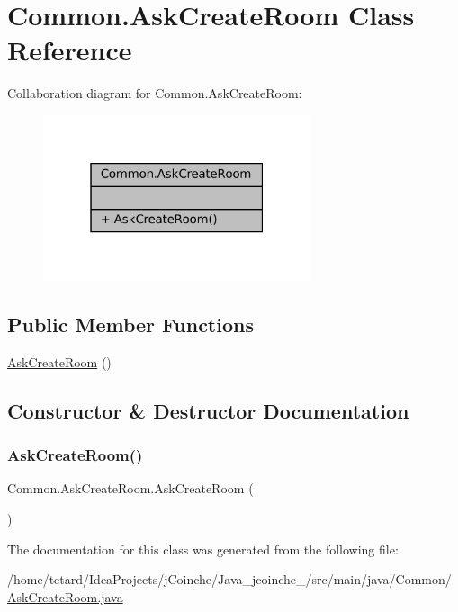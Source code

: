 \hypertarget{classCommon_1_1AskCreateRoom}{}\section{Common.\+Ask\+Create\+Room Class Reference}
\label{classCommon_1_1AskCreateRoom}


Collaboration diagram for Common.\+Ask\+Create\+Room\+:
\nopagebreak
\begin{figure}[H]
\begin{center}
\leavevmode
\includegraphics[width=223pt]{classCommon_1_1AskCreateRoom__coll__graph}
\end{center}
\end{figure}
\subsection*{Public Member Functions}
\begin{DoxyCompactItemize}
\item 
\mbox{\hyperlink{classCommon_1_1AskCreateRoom_ad7300cacf0663fd4f4a618219ae41ab3}{Ask\+Create\+Room}} ()
\end{DoxyCompactItemize}


\subsection{Constructor \& Destructor Documentation}
\mbox{\label{classCommon_1_1AskCreateRoom_ad7300cacf0663fd4f4a618219ae41ab3}} 
\subsubsection{\texorpdfstring{Ask\+Create\+Room()}{AskCreateRoom()}}
{\footnotesize\ttfamily Common.\+Ask\+Create\+Room.\+Ask\+Create\+Room (\begin{DoxyParamCaption}{ }\end{DoxyParamCaption})\hspace{0.3cm}{\ttfamily [inline]}}



The documentation for this class was generated from the following file\+:\begin{DoxyCompactItemize}
\item 
/home/tetard/\+Idea\+Projects/j\+Coinche/\+Java\+\_\+jcoinche\+\_/src/main/java/\+Common/\mbox{\hyperlink{AskCreateRoom_8java}{Ask\+Create\+Room.\+java}}\end{DoxyCompactItemize}
